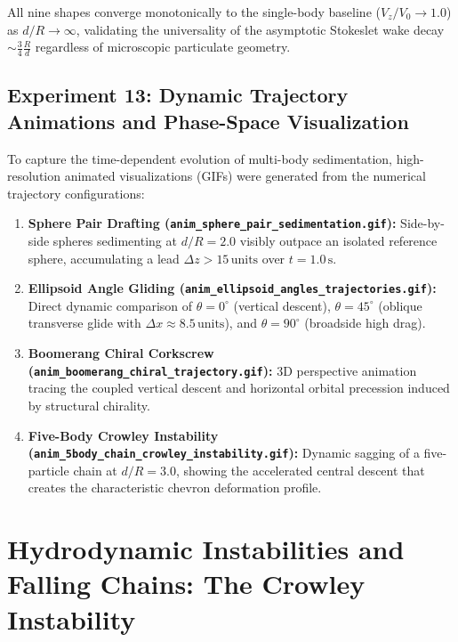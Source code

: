 \documentclass[11pt,a4paper]{article}
\begin{document}
All nine shapes converge monotonically to the single-body baseline ($V_z / V_0 \to 1.0$) as $d/R \to \infty$, validating the universality of the asymptotic Stokeslet wake decay $\sim \frac{3}{4}\frac{R}{d}$ regardless of microscopic particulate geometry.

\subsection{Experiment 13: Dynamic Trajectory Animations and Phase-Space Visualization}

To capture the time-dependent evolution of multi-body sedimentation, high-resolution animated visualizations (GIFs) were generated from the numerical trajectory configurations:
\begin{enumerate}
    \item \textbf{Sphere Pair Drafting (\texttt{anim\_sphere\_pair\_sedimentation.gif}):} Side-by-side spheres sedimenting at $d/R = 2.0$ visibly outpace an isolated reference sphere, accumulating a lead $\Delta z > 15\,\text{units}$ over $t = 1.0\,\text{s}$.
    \item \textbf{Ellipsoid Angle Gliding (\texttt{anim\_ellipsoid\_angles\_trajectories.gif}):} Direct dynamic comparison of $\theta = 0^\circ$ (vertical descent), $\theta = 45^\circ$ (oblique transverse glide with $\Delta x \approx 8.5\,\text{units}$), and $\theta = 90^\circ$ (broadside high drag).
    \item \textbf{Boomerang Chiral Corkscrew (\texttt{anim\_boomerang\_chiral\_trajectory.gif}):} 3D perspective animation tracing the coupled vertical descent and horizontal orbital precession induced by structural chirality.
    \item \textbf{Five-Body Crowley Instability (\texttt{anim\_5body\_chain\_crowley_instability.gif}):} Dynamic sagging of a five-particle chain at $d/R = 3.0$, showing the accelerated central descent that creates the characteristic chevron deformation profile.
\end{enumerate}

\section{Hydrodynamic Instabilities and Falling Chains: The Crowley Instability}
\end{document}

